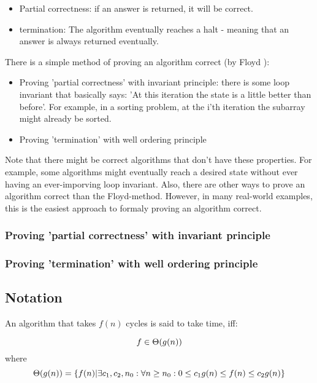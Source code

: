 \begin{itemize}
    \item Partial correctness: if an answer is returned, it will be correct.
    \item termination: The algorithm eventually reaches a halt - meaning that an answer is always returned eventually. 
\end{itemize}

There is a simple method of proving an algorithm correct (by Floyd ):
\begin{itemize}
    \item Proving 'partial correctness' with invariant principle: there is some loop invariant that basically says: 'At this iteration the state is a little better than before'. For example, in a sorting problem, at the i'th iteration the subarray  might already be sorted. 
    \item Proving 'termination' with well ordering principle
\end{itemize}

Note that there might be correct algorithms that don't have these properties. For example, some algorithms might eventually reach a desired state without ever having an ever-imporving loop invariant. Also, there are other ways to prove an algorithm correct than the Floyd-method. However, in many real-world examples, this is the easiest approach to formaly proving an algorithm correct. 

\subsubsection{ Proving 'partial correctness' with invariant principle }

\subsubsection{ Proving 'termination' with well ordering principle }



\subsection{Notation}

An algorithm that takes $f(n)$ cycles is said to take  time, iff: 

$$ f \in \Theta(g(n)) $$ 
where 
$$ \Theta(g(n)) = \{ f(n) | \exists c_1, c_2, n_0 : \forall n \geq n_0:  0 \leq c_1 g(n) \leq f(n) \leq c_2 g(n) \} $$

